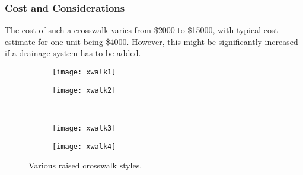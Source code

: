 \subsubsection{Cost and Considerations}

The cost of such a crosswalk varies from \$2000 to \$15000, with typical cost estimate for one unit being \$4000\cite{traffic-calming-xwalks}. However, this might be significantly increased if a drainage system has to be added.

\begin{figure}[!htbp]
\centering
\begin{subfigure}[t]{0.45\textwidth}
	\texttt{[image: xwalk1]}
\end{subfigure}
\begin{subfigure}[t]{0.45\textwidth}
	\texttt{[image: xwalk2]}
\end{subfigure}\\
\begin{subfigure}[t]{0.45\textwidth}
	\texttt{[image: xwalk3]}
\end{subfigure}
\begin{subfigure}[t]{0.45\textwidth}
	\texttt{[image: xwalk4]}
\end{subfigure}
\caption[Various raised crosswalk styles]{Various raised crosswalk styles.\cite{traffic-calming-xwalks}}
\end{figure}